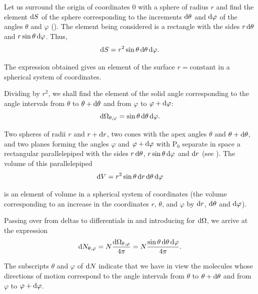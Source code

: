 Let us surround the origin of coordinates $0$ with a sphere of radius $r$ and find the element $\mathrm{d} S$ of the sphere corresponding to the increments $\mathrm{d}\theta$ and $\mathrm{d}\varphi$ of the angles $\theta$ and $\varphi$ (). The element being considered is a rectangle with the sides $r\,\mathrm{d}\theta$ and $r\sin\theta\,\mathrm{d}\varphi$. Thus,
\begin{equation}\label{eq:11_14}
	\mathrm{d} S = r^2 \sin\theta\,\mathrm{d}\theta\,\mathrm{d}\varphi.
\end{equation}

\noindent
The expression obtained gives an element of the surface $r=\text{constant}$ in a spherical system of coordinates.

Dividing  by $r^2$, we shall find the element of the solid angle corresponding to the angle intervals from $\theta$ to $\theta+\mathrm{d}\theta$ and from $\varphi$ to $\varphi+\mathrm{d}\varphi$:
\begin{equation}\label{eq:11_15}
	\mathrm{d}\Omega_{\theta,\varphi} = \sin\theta\, \mathrm{d}\theta \,\mathrm{d}\varphi.
\end{equation}

Two spheres of radii $r$ and $r+\mathrm{d} r$, two cones with the apex angles $\theta$ and $\theta+\mathrm{d}\theta$, and two planes forming the angles $\varphi$ and $\varphi+\mathrm{d}\varphi$ with P$_0$ separate in space a rectangular parallelepiped with the sides $r\,\mathrm{d}\theta$, $r\sin\theta\,\mathrm{d}\varphi$ and $\mathrm{d} r$ (see ). The volume of this parallelepiped
\begin{equation}\label{eq:11_16}
	\mathrm{d} V = r^2\sin\theta\, \mathrm{d} r\, \mathrm{d}\theta \,\mathrm{d}\varphi
\end{equation}

\noindent
is an element of volume in a spherical system of coordinates (the volume corresponding to an increase in the coordinates $r$, $\theta$, and $\varphi$ by $\mathrm{d} r$, $\mathrm{d}\theta$ and $\mathrm{d}\varphi$).

Passing over from deltas to differentials in  and introducing  for $\mathrm{d}\Omega$, we arrive at the expression
\begin{equation}\label{eq:11_17}
	\mathrm{d} N_{\theta,\varphi} = N\frac{\mathrm{d}\Omega_{\theta,\varphi}}{4\pi} = N\frac{\sin\theta\,\mathrm{d}\theta\,\mathrm{d}\varphi}{4\pi}.
\end{equation}

\noindent
The subscripts $\theta$ and $\varphi$ of $\mathrm{d} N$ indicate that we have in view the molecules whose directions of motion correspond to the angle intervals from $\theta$ to $\theta+\mathrm{d}\theta$ and from $\varphi$ to $\varphi+\mathrm{d}\varphi$.

